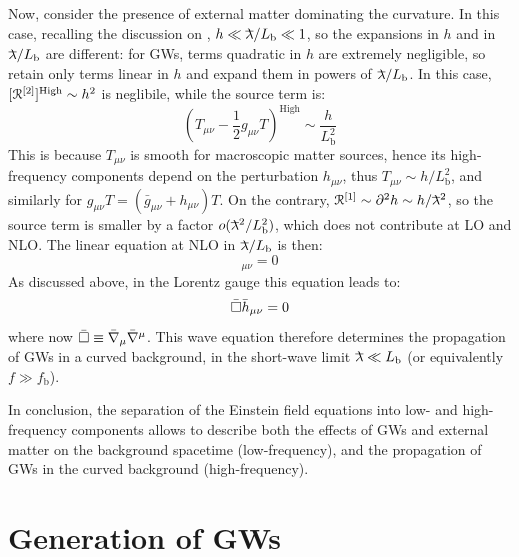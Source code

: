 Now, consider the presence of external matter dominating the curvature. In this case, recalling the discussion on , $ h \ll \lbar / L_\text{b} \ll 1 $, so the expansions in $ h $ and in $ \lbar / L_\text{b} $ are different: for GWs, terms quadratic in $ h $ are extremely negligible, so retain only terms linear in $ h $ and expand them in powers of $ \lbar / L_\text{b} $. In this case, $ [\EuScript{R}^{[2]}]^\text{High} \sim h^2 $ is neglibile, while the source term is:
\begin{equation*}
  \left( T_{\mu \nu} - \frac{1}{2} g_{\mu \nu} T \right)^\text{High} \sim \frac{h}{L_\text{b}^2}
\end{equation*}
This is because $ T_{\mu \nu} $ is smooth for macroscopic matter sources, hence its high-frequency components depend on the perturbation $ h_{\mu \nu} $, thus $ T_{\mu \nu} \sim h / L_\text{b}^2 $, and similarly for $ g_{\mu \nu} T = (\bar{g}_{\mu \nu} + h_{\mu \nu}) T $. On the contrary, $ \rr\od1 \sim \pa^2 h \sim h / \lbar^2 $, so the source term is smaller by a factor $ \smo (\lbar^2 / L_\text{b}^2) $, which does not contribute at LO and NLO. The linear equation at NLO in $ \lbar / L_\text{b} $ is then:
\begin{equation*}
  [\rr\od1]_{\mu \nu} = 0
\end{equation*}
As discussed above, in the Lorentz gauge this equation leads to:
\begin{equation}
  \bar{\Box} \bar{h}_{\mu \nu} = 0
\end{equation}
where now $ \bar{\Box} \equiv \bar{\nabla}_\mu \bar{\nabla}^\mu $. This wave equation therefore determines the propagation of GWs in a curved background, in the short-wave limit $ \lbar \ll L_\text{b} $ (or equivalently $ f \gg f_\text{b} $). 

In conclusion, the separation of the Einstein field equations into low- and high-frequency components allows to describe both the effects of GWs and external matter on the background spacetime (low-frequency), and the propagation of GWs in the curved background (high-frequency).

\section{Generation of GWs}










